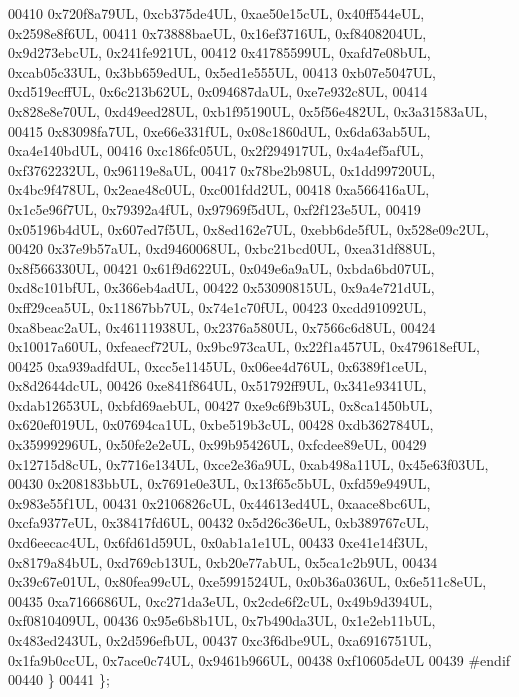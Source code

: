 \begin{DoxyCode}
00410     0x720f8a79UL, 0xcb375de4UL, 0xae50e15cUL, 0x40ff544eUL, 0x2598e8f6UL,
00411     0x73888baeUL, 0x16ef3716UL, 0xf8408204UL, 0x9d273ebcUL, 0x241fe921UL,
00412     0x41785599UL, 0xafd7e08bUL, 0xcab05c33UL, 0x3bb659edUL, 0x5ed1e555UL,
00413     0xb07e5047UL, 0xd519ecffUL, 0x6c213b62UL, 0x094687daUL, 0xe7e932c8UL,
00414     0x828e8e70UL, 0xd49eed28UL, 0xb1f95190UL, 0x5f56e482UL, 0x3a31583aUL,
00415     0x83098fa7UL, 0xe66e331fUL, 0x08c1860dUL, 0x6da63ab5UL, 0xa4e140bdUL,
00416     0xc186fc05UL, 0x2f294917UL, 0x4a4ef5afUL, 0xf3762232UL, 0x96119e8aUL,
00417     0x78be2b98UL, 0x1dd99720UL, 0x4bc9f478UL, 0x2eae48c0UL, 0xc001fdd2UL,
00418     0xa566416aUL, 0x1c5e96f7UL, 0x79392a4fUL, 0x97969f5dUL, 0xf2f123e5UL,
00419     0x05196b4dUL, 0x607ed7f5UL, 0x8ed162e7UL, 0xebb6de5fUL, 0x528e09c2UL,
00420     0x37e9b57aUL, 0xd9460068UL, 0xbc21bcd0UL, 0xea31df88UL, 0x8f566330UL,
00421     0x61f9d622UL, 0x049e6a9aUL, 0xbda6bd07UL, 0xd8c101bfUL, 0x366eb4adUL,
00422     0x53090815UL, 0x9a4e721dUL, 0xff29cea5UL, 0x11867bb7UL, 0x74e1c70fUL,
00423     0xcdd91092UL, 0xa8beac2aUL, 0x46111938UL, 0x2376a580UL, 0x7566c6d8UL,
00424     0x10017a60UL, 0xfeaecf72UL, 0x9bc973caUL, 0x22f1a457UL, 0x479618efUL,
00425     0xa939adfdUL, 0xcc5e1145UL, 0x06ee4d76UL, 0x6389f1ceUL, 0x8d2644dcUL,
00426     0xe841f864UL, 0x51792ff9UL, 0x341e9341UL, 0xdab12653UL, 0xbfd69aebUL,
00427     0xe9c6f9b3UL, 0x8ca1450bUL, 0x620ef019UL, 0x07694ca1UL, 0xbe519b3cUL,
00428     0xdb362784UL, 0x35999296UL, 0x50fe2e2eUL, 0x99b95426UL, 0xfcdee89eUL,
00429     0x12715d8cUL, 0x7716e134UL, 0xce2e36a9UL, 0xab498a11UL, 0x45e63f03UL,
00430     0x208183bbUL, 0x7691e0e3UL, 0x13f65c5bUL, 0xfd59e949UL, 0x983e55f1UL,
00431     0x2106826cUL, 0x44613ed4UL, 0xaace8bc6UL, 0xcfa9377eUL, 0x38417fd6UL,
00432     0x5d26c36eUL, 0xb389767cUL, 0xd6eecac4UL, 0x6fd61d59UL, 0x0ab1a1e1UL,
00433     0xe41e14f3UL, 0x8179a84bUL, 0xd769cb13UL, 0xb20e77abUL, 0x5ca1c2b9UL,
00434     0x39c67e01UL, 0x80fea99cUL, 0xe5991524UL, 0x0b36a036UL, 0x6e511c8eUL,
00435     0xa7166686UL, 0xc271da3eUL, 0x2cde6f2cUL, 0x49b9d394UL, 0xf0810409UL,
00436     0x95e6b8b1UL, 0x7b490da3UL, 0x1e2eb11bUL, 0x483ed243UL, 0x2d596efbUL,
00437     0xc3f6dbe9UL, 0xa6916751UL, 0x1fa9b0ccUL, 0x7ace0c74UL, 0x9461b966UL,
00438     0xf10605deUL
00439 \textcolor{preprocessor}{#endif}
00440   \}
00441 \};
\end{DoxyCode}
